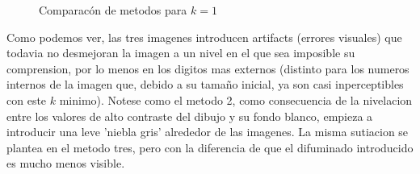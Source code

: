 \begin{figure}[H]
    \centering
    \qquad
    \qquad
    \caption{Comparacón de metodos para $k = 1$}%
    \label{fig:example}%
\end{figure}

Como podemos ver, las tres imagenes introducen artifacts (errores visuales) que todavia no desmejoran la imagen a un nivel en el que sea imposible su comprension, por lo menos en los digitos mas externos (distinto para los numeros internos de la imagen que, debido a su tamaño inicial, ya son casi inperceptibles con este $k$ minimo). Notese como el metodo 2, como consecuencia de la nivelacion entre los valores de alto contraste del dibujo y su fondo blanco, empieza a introducir una leve 'niebla gris' alrededor de las imagenes. La misma sutiacion se plantea en el metodo tres, pero con la diferencia de que el difuminado introducido es mucho menos visible.

